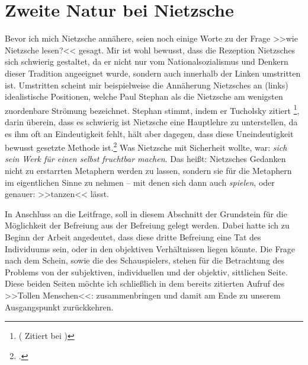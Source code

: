 \documentclass[12pt, a4paper, openany]{report}
\begin{document}
\section{Zweite Natur bei Nietzsche}\label{abschnitt_2}
Bevor ich mich Nietzsche annähere, seien noch einige Worte zu der Frage >>wie Nietzsche lesen?<< gesagt.
Mir ist wohl bewusst, dass die Rezeption Nietzsches sich schwierig gestaltet, da er nicht nur vom Nationalsozialismus und Denkern dieser Tradition angeeignet wurde, sondern auch innerhalb der Linken umstritten ist.
Umstritten scheint mir beispielweise die Annäherung Nietzsches an (links) idealistische Positionen, welche Paul Stephan als die Nietzsche am wenigsten zuordenbare Strömung bezeichnet.
Stephan stimmt, indem er Tucholsky zitiert%
 \footnote{
     ( Zitiert bei \cite[][17]{stephan_nietzscheanismus_2019})
},
darin überein, dass es schwierig ist Nietzsche eine Hauptlehre zu unterstellen, da es ihm oft an Eindeutigkeit fehlt, hält aber dagegen, dass diese Uneindeutigkeit bewusst gesetzte Methode ist.\footcite[Vgl.][18]{stephan_nietzscheanismus_2019}
Was Nietzsche mit Sicherheit wollte, war: \emph{sich sein Werk für einen selbst fruchtbar machen}. 
Das heißt: Nietzsches Gedanken nicht zu erstarrten Metaphern werden zu lassen, sondern sie für die Metaphern im eigentlichen Sinne zu nehmen -- mit denen sich dann auch \emph{spielen}, oder genauer: >>tanzen<< lässt.

In Anschluss an die Leitfrage, soll in diesem Abschnitt der Grundstein für die Möglichkeit der Befreiung aus der Befreiung gelegt werden.
Dabei hatte ich zu Beginn der Arbeit angedeutet, dass diese dritte Befreiung eine Tat des Individuums sein, oder in den objektiven Verhältnissen liegen könnte. 
Die Frage nach dem Schein, sowie die des Schauspielers, stehen für die Betrachtung des Problems von der subjektiven, individuellen und der objektiv, sittlichen Seite. 
Diese beiden Seiten möchte ich schließlich in dem bereits zitierten Aufruf des >>Tollen Menschen<<:  zusammenbringen und damit am Ende zu unserem Ausgangspunkt zurückkehren. 
\end{document}
